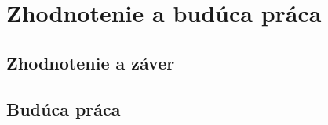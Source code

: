 %

\chapter{Zhodnotenie a budúca práca}
\label{conclusionandfuturework}


\section{Zhodnotenie a záver}
\label{conclusionandfuturework.summary}


\section{Budúca práca}
\label{conclusionandfuturework.futurework}


